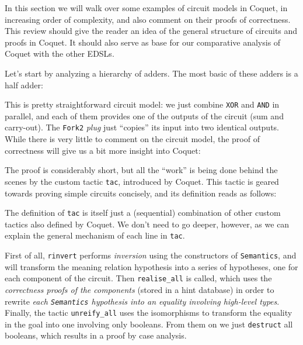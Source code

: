             In this section we will walk over some examples of circuit models in Coquet, in
            increasing order of complexity, and also comment on their proofs of correctness. This
            review should give the reader an idea of the general structure of circuits and proofs in
            Coquet. It should also serve as base for our comparative analysis of Coquet with the
            other EDSLs.

            Let's start by analyzing a hierarchy of adders. The most basic of these adders is a half
            adder:


            This is pretty straightforward circuit model: we just combine \texttt{XOR} and
            \texttt{AND} in parallel, and each of them provides one of the outputs of the circuit
            (sum and carry-out). The \texttt{Fork2} \emph{plug} just ``copies'' its input into two
            identical outputs. While there is very little to comment on the circuit model, the proof
            of correctness will give us a bit more insight into Coquet:


            The proof is considerably short, but all the ``work'' is being done behind the scenes by
            the custom tactic \texttt{tac}, introduced by Coquet. This tactic is geared towards
            proving simple circuits concisely, and its definition reads as follows:


            The definition of \texttt{tac} is itself just a (sequential) combination of other custom
            tactics also defined by Coquet. We don't need to go deeper, however, as we can explain
            the general mechanism of each line in \texttt{tac}.

            First of all, \texttt{rinvert} performs \emph{inversion} using the constructors of
            \texttt{Semantics}, and will transform the meaning relation hypothesis into a series of
            hypotheses, one for each component of the circuit. Then \texttt{realise\_all} is called,
            which uses the \emph{correctness proofs of the components} (stored in a hint database)
            in order to rewrite \emph{each \texttt{Semantics} hypothesis into an equality involving
                high-level types}. Finally, the tactic \texttt{unreify\_all} uses the isomorphisms
            to transform the equality in the goal into one involving only booleans. From them on we
            just \texttt{destruct} all booleans, which results in a proof by case analysis.

